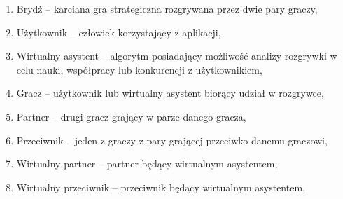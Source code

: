 \begin{enumerate}
  \item Brydż -- karciana gra strategiczna rozgrywana przez dwie pary graczy,
  \item Użytkownik -- człowiek korzystający z aplikacji,
  \item Wirtualny asystent -- algorytm posiadający możliwość analizy rozgrywki w celu nauki, współpracy lub konkurencji z użytkownikiem,
  \item Gracz -- użytkownik lub wirtualny asystent biorący udział w rozgrywce,
  \item Partner -- drugi gracz grający w parze danego gracza,
  \item Przeciwnik -- jeden z graczy z pary grającej przeciwko danemu graczowi,
  \item Wirtualny partner -- partner będący wirtualnym asystentem,
  \item Wirtualny przeciwnik -- przeciwnik będący wirtualnym asystentem,
\end{enumerate}
